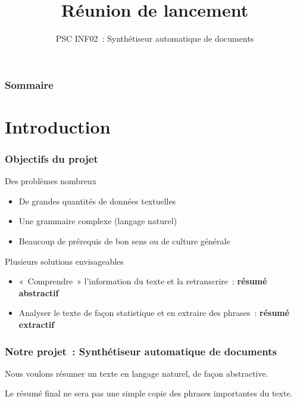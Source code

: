 \documentclass{beamer}
\title{Réunion de lancement}
\subtitle{PSC INF02~: Synthétiseur automatique de documents}
\author{}
\institute{École polytechnique}
\date{}
\begin{document}
\begin{frame}
  \titlepage{}

\end{frame}
\begin{frame}
\frametitle{Sommaire}
\tableofcontents
\end{frame}



\section{Introduction}

\begin{frame}%
\frametitle{Objectifs du projet}%

\begin{block}{Des problèmes nombreux}
\begin{itemize}
 \item De grandes quantités de données textuelles
 \item Une grammaire complexe (langage naturel)
 \item Beaucoup de prérequis de bon sens ou de culture générale %
\end{itemize}

\end{block}


\begin{block}{Plusieurs solutions envisageables}
\begin{itemize}
\item «~Comprendre~» l'information du texte et la retranscrire~: \textbf{résumé abstractif}
\item Analyser le texte de façon statistique et en extraire des phrases~: \textbf{résumé extractif} %
\end{itemize}
\end{block}


\end{frame}


\begin{frame}
\frametitle{Notre projet~: Synthétiseur automatique de documents}

Nous voulons résumer un texte en langage naturel, de façon abstractive.

Le résumé final ne sera pas une simple copie des phrases importantes du texte.

\end{frame}
\end{document}
